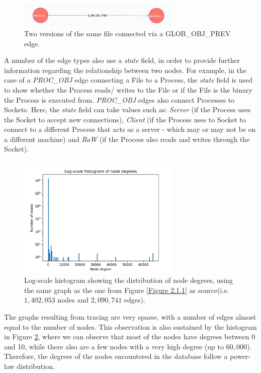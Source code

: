 	\begin{figure}[H]
		\centering

		\includegraphics[width=0.7\textwidth]{graphics/GLOB_OBJ_PREV}
		\caption{
			Two versions of the same file connected via a GLOB\_OBJ\_PREV edge.
		}
		\label{Figure 2.1.2}
	\end{figure}
	A number of the edge types also use a \textit{state} field, in order to provide further information regarding the relationship between two nodes. For example, in the case of a \textit{PROC\_OBJ} edge connecting a File to a Process, the \textit{state} field is used to show whether the Process reads/ writes to the File or if the File is the binary the Process is executed from. \textit{PROC\_OBJ} edges also connect Processes to Sockets. Here, the \textit{state} field can take values such as: \textit{Server} (if the Process uses the Socket to accept new connections), \textit{Client} (if the Process uses to Socket to connect to a different Process that acts as a server - which may or may not be on a different machine)  and \textit{RaW} (if the Process also reads and writes through the Socket).
	\begin{figure}[H]
		\centering
		
		\includegraphics[width=0.7\textwidth]{graphics/node_degree_hist}
		\caption[Log-scale distribution of node degrees]{
			Log-scale histogram showing the distribution of node degrees, using the same graph as the one from Figure \ref{Figure 2.1.1} as source(i.e. $1,402,053$ nodes and $2,090,741$ edges).
		}
		\label{Figure 2.1.3}
	\end{figure}
	 
	 The graphs resulting from tracing are very sparse, with a number of edges almost equal to the number of nodes. This observation is also sustained by the histogram in Figure \ref{Figure 2.1.3}, where we can observe that most of the nodes have degrees between 0 and 10, while there also are a few nodes with a very high degree (up to $60, 000$). Therefore, the degrees of the nodes encountered in the database follow a power-law distribution\cite{Clauset:2009:PDE:1655787.1655789}.
	 
